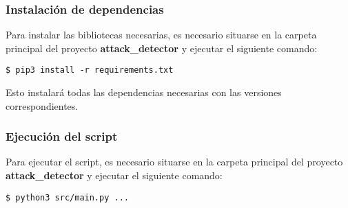 \subsubsection{Instalación de dependencias}
\label{subsubsec:InstalacionDependencias}
Para instalar las bibliotecas necesarias, es necesario situarse en la carpeta principal del proyecto \textbf{attack\_detector} y ejecutar el siguiente comando:

\begin{verbatim}
$ pip3 install -r requirements.txt
\end{verbatim}

Esto instalará todas las dependencias necesarias con las versiones correspondientes.

\subsubsection{Ejecución del script}
\label{subsubsec:EjecucionScript}
Para ejecutar el script, es necesario situarse en la carpeta principal del proyecto \textbf{attack\_detector} y ejecutar el siguiente comando:

\begin{verbatim}
$ python3 src/main.py ...
\end{verbatim}

